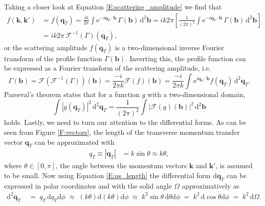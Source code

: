 \documentclass[a4paper, twoside, english, 12pt]{report}
\begin{document}
Taking a closer look at Equation \eqref{E:scattering_amplitude} we find that 
\begin{align}\label{E:f_from_gamma}
	f(\mathbf{k},\mathbf{k'}) &= f(\mathbf{q}_T) = \frac{ik}{2\pi}\int \text{e}^{-i\mathbf{q}_T\cdot\mathbf{b}}\,\Gamma(\mathbf{b}) \,\text{d}^2\mathbf{b} = ik2\pi\left[\frac{1}{(2\pi)^2}\int \text{e}^{-i\mathbf{q}_T\cdot\mathbf{b}}\,\Gamma(\mathbf{b}) \,\text{d}^2\mathbf{b}\right] \nonumber \\
	&=ik2\pi \,\mathcal{F}^{-1}(\Gamma)(\mathbf{q}_T),
\end{align}
or the scattering amplitude $f(\mathbf{q}_T)$ is a two-dimensional inverse Fourier transform of the profile function $\Gamma(\mathbf{b})$. Inverting this, the profile function can be expressed as a Fourier transform of the scattering amplitude, i.e.
\begin{equation}\label{E:gamma_from_f}
	\Gamma (\mathbf{b}) = \mathcal{F}\left(\mathcal{F}^{-1}(\Gamma)\right)(\mathbf{b}) = \frac{-i}{2\pi k}\mathcal{F}\left(f\right)(\mathbf{b}) = \frac{-i}{2\pi k} \int \text{e}^{i\mathbf{q}_T\cdot\mathbf{b}}f(\mathbf{q}_T) \,\text{d}^2\mathbf{q}_T.
\end{equation}
Parseval's theorem states that for a function $g$ with a two-dimensional domain,
\begin{equation}\label{E:Parsevals_theorem}
	\int |g(\mathbf{q}_T)|^2\,\text{d}^2\mathbf{q}_T = \frac{1}{(2\pi)^2} \int |\mathcal{F}\left(g\right)(\mathbf{b})|^2\,\text{d}^2\mathbf{b}
\end{equation}
holds. 	Lastly, we need to turn our attention to the differential forms. As can be seen from Figure \ref{F:vectors}, the length of the transverse momentum transfer vector $\mathbf{q}_T$ can be approximated with
\begin{align}\label{E:qs_length}
	q_T \equiv |\mathbf{q}_T|&=k\sin\theta \approx k\theta,
\end{align}
where $\theta \in \left[0,\pi\right]$, the angle between the momentum vectors $\mathbf{k}$ and $\mathbf{k'}$, is assumed to be small. Now using Equation \eqref{E:qs_length} the differential form $\text{d}\mathbf{q}_T$ can be expressed in polar coordinates and with the solid angle $\Omega$ approximatively as
\begin{align}\label{E:differential_q_into_solid_angle}
\text{d}^2\mathbf{q}_T \; &=\; q_T\,\text{d}q_T\text{d}\phi \;\approx\; (k\theta)\text{d}(k\theta)\text{d}\phi \;\approx\; k^2\sin\theta\,\text{d}\theta\text{d}\phi \;=\; k^2\,\text{d}\cos\theta\text{d}\phi \;=\; k^2\,\text{d}\Omega.
\end{align}
\end{document}
